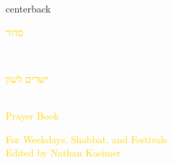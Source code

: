 \documentclass[
coverheight=8.75in,
coverwidth=5.625in,
spinewidth=1.063in,
bleedwidth=.75in,
marklength=0in,
12pt,
pagecolor=black,
]{bookcover}
\newcommand{\hebtext}[1]{
\begin{hebrew}
	#1
\end{hebrew}
}
\begin{document}
\begin{bookcover}

	\begin{bookcoverelement}{center}{back}
		\begin{Huge}
			\textcolor{gold}{\hebtext{ סדור }}\\
			\textcolor{gold}{\hebtext{ישרים לשון}}\\
			\textcolor{gold}{Prayer Book}
				
		\end{Huge}
		\vspace{2\baselineskip}
		\begin{large}
			\textcolor{gold}{For Weekdays, Shabbat, and Festivals\\Edited by Nathan Kasimer}
		\end{large}
	\end{bookcoverelement}
	\end{bookcover}
	
\end{document}
